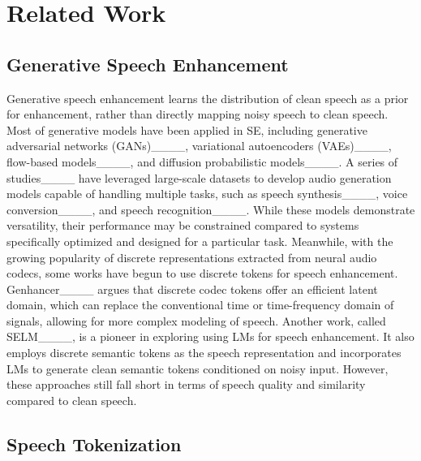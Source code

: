 \section{Related Work}
\subsection{Generative Speech Enhancement}
Generative speech enhancement learns the distribution of clean speech as a prior for enhancement, rather than directly mapping noisy speech to clean speech. Most of generative models have been applied in SE, including generative adversarial networks (GANs)____, variational autoencoders (VAEs)____, flow-based models____, and diffusion probabilistic models____. 
A series of studies____ have leveraged large-scale datasets to develop audio generation models capable of handling multiple tasks, such as speech synthesis____, voice conversion____, and speech recognition____. While these models demonstrate versatility, their performance may be constrained compared to systems specifically optimized and designed for a particular task.
Meanwhile, with the growing popularity of discrete representations extracted from neural audio codecs, some works have begun to use discrete tokens for speech enhancement. 
Genhancer____ argues that discrete codec tokens offer an efficient latent domain, which can replace the conventional time or time-frequency domain of signals, allowing for more complex modeling of speech.
Another work, called SELM____, is a pioneer in exploring using LMs for speech enhancement. It also employs discrete semantic tokens as the speech representation and incorporates LMs to generate clean semantic tokens conditioned on noisy input. However, these approaches still fall short in terms of speech quality and similarity compared to clean speech. 



\subsection{Speech Tokenization}

